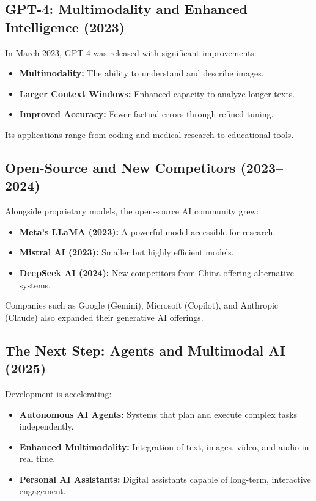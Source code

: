 \subsection{GPT-4: Multimodality and Enhanced Intelligence (2023)}

In March 2023, GPT-4 was released with significant improvements:
\begin{itemize}
  \item \textbf{Multimodality:} The ability to understand and describe images.
  \item \textbf{Larger Context Windows:} Enhanced capacity to analyze longer texts.
  \item \textbf{Improved Accuracy:} Fewer factual errors through refined tuning.
\end{itemize}
Its applications range from coding and medical research to educational tools.

\subsection{Open-Source and New Competitors (2023--2024)}

Alongside proprietary models, the open-source AI community grew:
\begin{itemize}
  \item \textbf{Meta’s LLaMA (2023):} A powerful model accessible for research.
  \item \textbf{Mistral AI (2023):} Smaller but highly efficient models.
  \item \textbf{DeepSeek AI (2024):} New competitors from China offering alternative systems.
\end{itemize}
Companies such as Google (Gemini), Microsoft (Copilot), and Anthropic (Claude) also expanded
their generative AI offerings.

\subsection{The Next Step: Agents and Multimodal AI (2025)}

Development is accelerating:
\begin{itemize}
  \item \textbf{Autonomous AI Agents:} Systems that plan and execute complex tasks
        independently.
  \item \textbf{Enhanced Multimodality:} Integration of text, images, video, and audio in real time.
  \item \textbf{Personal AI Assistants:} Digital assistants capable of long-term, interactive
        engagement.
\end{itemize}

